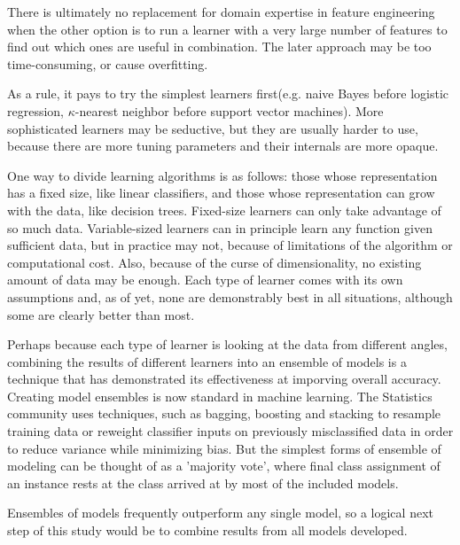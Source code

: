 There is ultimately no replacement for domain expertise in feature engineering when the other option is to run a learner with a very large number of features to find out which ones are useful in combination. The later approach may be too time-consuming, or cause overfitting. \cite{Eklund2014}

As a rule, it pays to try the simplest learners first(e.g. naive Bayes before logistic regression, $\kappa$-nearest neighbor before support vector machines). More sophisticated learners may be seductive, but they are usually harder to use, because there are more tuning parameters and their internals are more opaque. \cite{Domingos2012}

One way to divide learning algorithms is as follows: those whose representation has a fixed size, like linear classifiers, and those whose representation can grow with the data, like decision trees. Fixed-size learners can only take advantage of so much data. Variable-sized learners can in principle learn any function given sufficient data, but in practice may not, because of limitations of the algorithm or computational cost. Also, because of the curse of dimensionality, no existing amount of data may be enough. \cite{Domingos2012} Each type of learner comes with its own assumptions and, as of yet, none are demonstrably best in all situations, although some are clearly better than most. \cite{Hand2006,Delgado2014}

Perhaps because each type of learner is looking at the data from different angles, combining the results of different learners into an ensemble of models is a technique that has demonstrated its effectiveness at imporving overall accuracy. Creating model ensembles is now standard in machine learning. The Statistics community uses techniques, such as bagging, boosting and stacking to resample training data or reweight classifier inputs on previously misclassified data in order to reduce variance while minimizing bias. But the simplest forms of ensemble of modeling can be thought of as a 'majority vote', where final class assignment of an instance rests at the class arrived at by most of the included models.


Ensembles of models frequently outperform any single model, so a logical next step of this study would be to combine results from all models developed.

